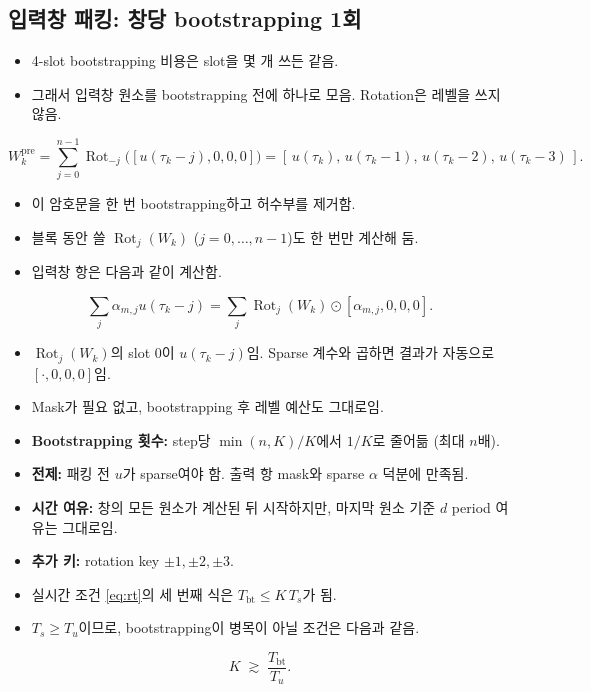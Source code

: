 \documentclass[11pt,a4paper]{article}
\newcommand{\Rot}{\operatorname{Rot}}
\begin{document}
\subsection{입력창 패킹: 창당 bootstrapping 1회}
\begin{itemize}
\item 4-slot bootstrapping 비용은 slot을 몇 개 쓰든 같음.
\item 그래서 입력창 원소를 bootstrapping 전에 하나로 모음. Rotation은 레벨을 쓰지 않음.
\end{itemize}
\begin{equation}
W_k^{\mathrm{pre}}=\sum_{j=0}^{n-1}\Rot_{-j}\bigl([u(\tau_k-j),0,0,0]\bigr)=[\,u(\tau_k),\,u(\tau_k-1),\,u(\tau_k-2),\,u(\tau_k-3)\,].
\end{equation}
\begin{itemize}
\item 이 암호문을 한 번 bootstrapping하고 허수부를 제거함.
\item 블록 동안 쓸 $\Rot_j(W_k)$ ($j=0,\dots,n-1$)도 한 번만 계산해 둠.
\item 입력창 항은 다음과 같이 계산함.
\end{itemize}
\begin{equation}
\sum_{j}\alpha_{m,j}u(\tau_k-j)=\sum_j \Rot_j(W_k)\odot[\alpha_{m,j},0,0,0].
\end{equation}
\begin{itemize}
\item $\Rot_j(W_k)$의 slot 0이 $u(\tau_k-j)$임. Sparse 계수와 곱하면 결과가 자동으로 $[\cdot,0,0,0]$임.
\item Mask가 필요 없고, bootstrapping 후 레벨 예산도 그대로임.
\item \textbf{Bootstrapping 횟수:} step당 $\min(n,K)/K$에서 $1/K$로 줄어듦 (최대 $n$배).
\item \textbf{전제:} 패킹 전 $u$가 sparse여야 함. 출력 항 mask와 sparse $\alpha$ 덕분에 만족됨.
\item \textbf{시간 여유:} 창의 모든 원소가 계산된 뒤 시작하지만, 마지막 원소 기준 $d$ period 여유는 그대로임.
\item \textbf{추가 키:} rotation key $\pm1,\pm2,\pm3$.
\item 실시간 조건 \eqref{eq:rt}의 세 번째 식은 $T_{\mathrm{bt}}\le K\,T_s$가 됨.
\item $T_s\ge T_u$이므로, bootstrapping이 병목이 아닐 조건은 다음과 같음.
\end{itemize}
\begin{equation}
K\;\gtrsim\;\frac{T_{\mathrm{bt}}}{T_u}.
\label{eq:Kmin}
\end{equation}
\end{document}
